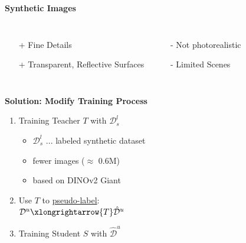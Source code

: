 \documentclass[12pt]{beamer}
\begin{document}
\begin{frame}
    \textbf{Synthetic Images}
    \begin{columns}
        \begin{itemize}
            \item[+] Fine Details
            \item[+] Transparent, Reflective Surfaces
        \end{itemize}
        \begin{itemize}
            \item[-] Not photorealistic
            \item[-] Limited Scenes
        \end{itemize}
    \end{columns}

    \vspace{0.5cm}
    \pause
    
    \textbf{Solution: Modify Training Process}
    \begin{enumerate}
        \item<2-> Training Teacher $T$ with   $\mathcal{D}^l_s$
        \begin{itemize}
            \item $\mathcal{D}^l_s$ ... labeled synthetic dataset
            \item fewer images ($\approx$ 0.6M)
            \item based on DINOv2 Giant
        \end{itemize}

        
        \item<3-> Use $T$ to \underline{pseudo-label}:
        \\$\mathcal{D}^u \xlongrightarrow{T} \hat{\mathcal{D}}^u $
        
        \item<4-> Training Student $S$ with  $\hat{\mathcal{D}}^u$
    \end{enumerate}
    
\end{frame}
\end{document}
